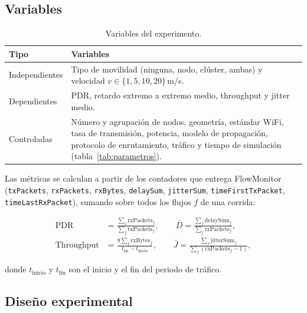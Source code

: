 \subsection{Variables}

\begin{table}[h]
\centering
\small
\begin{tabular}{p{2.6cm}p{9.4cm}}
\toprule
\textbf{Tipo} & \textbf{Variables} \\
\midrule
Independientes & Tipo de movilidad (ninguna, nodo, clúster, ambas) y velocidad
$v \in \{1, 5, 10, 20\}$\,m/s. \\
Dependientes & PDR, retardo extremo a extremo medio, throughput y jitter medio. \\
Controladas & Número y agrupación de nodos, geometría, estándar WiFi, tasa de
transmisión, potencia, modelo de propagación, protocolo de enrutamiento, tráfico y
tiempo de simulación (tabla~\ref{tab:parametros}). \\
\bottomrule
\end{tabular}
\caption{Variables del experimento.}
\label{tab:variables}
\end{table}

{\sloppy
Las métricas se calculan a partir de los contadores que entrega FlowMonitor
(\texttt{txPackets}, \texttt{rxPackets}, \texttt{rxBytes}, \texttt{delaySum},
\texttt{jitterSum}, \texttt{timeFirstTxPacket}, \texttt{timeLastRxPacket}), sumando sobre
todos los flujos $f$ de una corrida:\par}

\begin{align*}
\mathrm{PDR} &= \frac{\sum_f \mathrm{rxPackets}_f}{\sum_f \mathrm{txPackets}_f},
\qquad
\bar{D} = \frac{\sum_f \mathrm{delaySum}_f}{\sum_f \mathrm{rxPackets}_f}, \\[4pt]
\mathrm{Throughput} &= \frac{8\sum_f \mathrm{rxBytes}_f}{t_{\mathrm{fin}} - t_{\mathrm{inicio}}},
\qquad
\bar{J} = \frac{\sum_f \mathrm{jitterSum}_f}{\sum_f (\mathrm{rxPackets}_f - 1)},
\end{align*}

donde $t_{\mathrm{inicio}}$ y $t_{\mathrm{fin}}$ son el inicio y el fin del periodo de
tráfico.

\subsection{Diseño experimental}
\label{sec:diseno-exp}

